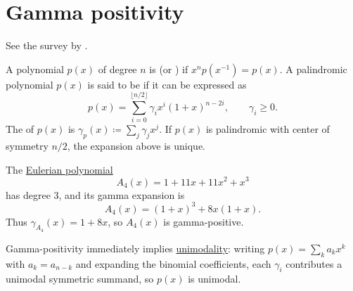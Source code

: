 


\section[gammaPositivity]{Gamma positivity}

See the survey by  \cite{Athanasiadis2018}.

A polynomial $p(x)$ of degree $n$ is
\label{palindromicPolynomial}
(or \label{symmetricPolynomial}) if
$x^n p(x^{-1}) = p(x)$.
A palindromic polynomial $p(x)$ is said to be
\label{gammaPositivePolynomial} if it can be expressed as
\[
 p(x) = \sum_{i=0}^{\lfloor n/2 \rfloor} \gamma_i x^i (1+x)^{n-2i}, \qquad \gamma_i \geq 0.
\]
The \label{gammaPolynomial} of $p(x)$ is
$\gamma_p(x) \coloneqq \sum_j \gamma_j x^j$.
If $p(x)$ is palindromic with center of symmetry $n/2$, the expansion above is unique.

\begin{example}
The \hyperref[eulerianGamma]{Eulerian polynomial}
\[
  A_4(x)=1+11x+11x^2+x^3
\]
has degree \(3\), and its gamma expansion is
\[
  A_4(x)=(1+x)^3+8x(1+x).
\]
Thus \(\gamma_{A_4}(x)=1+8x\), so \(A_4(x)\) is gamma-positive.
\end{example}

Gamma-positivity immediately implies \hyperref[unimodalPolynomial]{unimodality}:
writing $p(x) = \sum_k a_k x^k$ with $a_k = a_{n-k}$ and expanding the
binomial coefficients, each $\gamma_i$ contributes a unimodal symmetric
summand, so $p(x)$ is unimodal.

